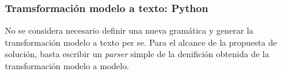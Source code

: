 \subsubsection*{Tramsformación modelo a texto: Python}

No se considera necesario definir una nueva gramática y generar la transformación modelo a texto per se. Para el alcance de la propuesta de solución, basta escribir un \textit{parser} simple de la denifición obtenida de la transformación modelo a modelo.